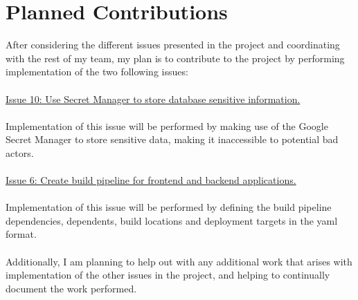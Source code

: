 \section*{Planned Contributions}
After considering the different issues presented in the project and coordinating with the rest of my team, my plan is to contribute to the project by performing implementation of the two following issues:\\\\
\href{https://gitlab.sdu.dk/jolee18/cloud-bite-terraform-g-10/-/issues/10}{Issue 10: Use Secret Manager to store database sensitive information.}\\\\
Implementation of this issue will be performed by making use of the Google Secret Manager to store sensitive data, making it inaccessible to potential bad actors.
\\
\\
\href{https://gitlab.sdu.dk/jolee18/cloud-bite-terraform-g-10/-/issues/6}{Issue 6: Create build pipeline for frontend and backend applications.}
\\\\
Implementation of this issue will be performed by defining the build pipeline dependencies, dependents, build locations and deployment targets in the yaml format.
\\\\
Additionally, I am planning to help out with any additional work that arises with implementation of the other issues in the project, and helping to continually document the work performed.